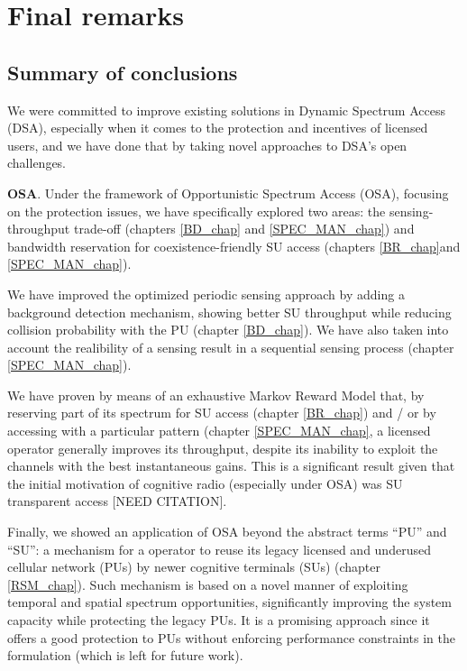 \chapter{Final remarks}\label{Conclusion_chap}

\section{Summary of conclusions}%
We were committed to improve existing solutions in Dynamic Spectrum Access (DSA), especially when it comes to the protection and incentives of licensed users, and we have done that by taking novel approaches to DSA's open challenges. 

\textbf{OSA}. Under the framework of Opportunistic Spectrum Access (OSA), focusing on the protection issues, we have specifically explored two areas: the sensing-throughput trade-off (chapters \ref{BD_chap} and \ref{SPEC_MAN_chap}) and bandwidth reservation for coexistence-friendly SU access (chapters \ref{BR_chap}and \ref{SPEC_MAN_chap}). 

We have improved the optimized periodic sensing approach by adding a background detection mechanism, showing better SU throughput while reducing collision probability with the PU (chapter \ref{BD_chap}). We have also taken into account the realibility of a sensing result in a sequential sensing process (chapter \ref{SPEC_MAN_chap}).

We have proven by means of an exhaustive Markov Reward Model that, by reserving part of its spectrum for SU access (chapter \ref{BR_chap}) and / or by accessing with a particular pattern (chapter \ref{SPEC_MAN_chap}, a licensed operator generally improves its throughput, despite its inability to exploit the channels with the best instantaneous gains. This is a significant result given that the initial motivation of cognitive radio (especially under OSA) was SU transparent access [NEED CITATION].

Finally, we showed an application of OSA beyond the abstract terms \enquote{PU} and \enquote{SU}: a mechanism for a operator to reuse its legacy licensed and underused cellular network (PUs) by newer cognitive terminals (SUs) (chapter \ref{RSM_chap}). Such mechanism is based on a novel manner of exploiting temporal and spatial spectrum opportunities, significantly improving the system capacity while protecting the legacy PUs. It is a promising approach since it offers a good protection to PUs without enforcing performance constraints in the formulation (which is left for future work).

